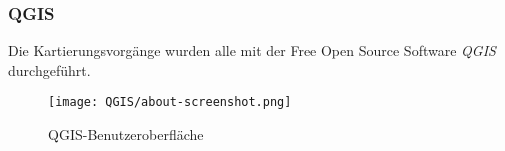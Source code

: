 \subsubsection*{QGIS}
Die Kartierungsvorgänge wurden alle mit der Free Open Source Software \emph{QGIS}\cite{qgis} durchgeführt.
\begin{figure}[ht]
    \centering
    \texttt{[image: QGIS/about-screenshot.png]}
    \caption{QGIS-Benutzeroberfläche}
\end{figure}
